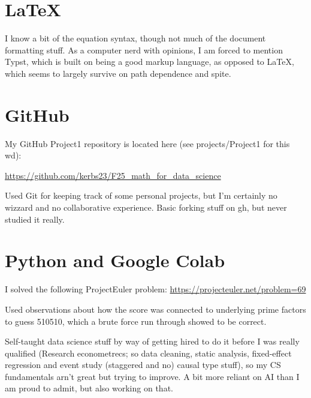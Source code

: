 \documentclass[letterpaper, 11pt]{amsart}
\begin{document}


\section{\LaTeX}

\medskip

 I know a bit of the equation syntax, though not much of the document formatting stuff. As a computer nerd with opinions, I am forced to mention Typst, which is built on being a good markup language, as opposed to \LaTeX, which seems to largely survive on path dependence and spite.

\section{GitHub}
My GitHub Project1 repository is located here (see projects/Project1 for this wd):
\begin{center}
\url{https://github.com/kerbs23/F25_math_for_data_science}
\end{center}



\medskip

 Used Git for keeping track of some personal projects, but I'm certainly no wizzard and no collaborative experience. Basic forking stuff on gh, but never studied it really.



\section{Python and Google Colab}
I solved the following ProjectEuler problem: \url{https://projecteuler.net/problem=69}

\medskip

\noindent Used observations about how the score was connected to underlying prime factors to guess 510510, which a brute force run through showed to be correct.

\medskip

 Self-taught data science stuff by way of getting hired to do it before I was really qualified (Research econometrecs; so data cleaning, static analysis, fixed-effect regression and event study (staggered and no) causal type stuff), so my CS fundamentals arn't great but trying to improve.
A bit more reliant on AI than I am proud to admit, but also working on that.
\end{document}
